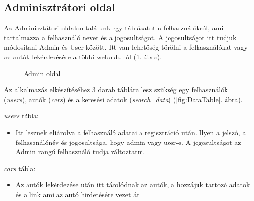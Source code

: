 \subsection{Adminisztrátori oldal}

Az Adminisztátori oldalon találunk egy táblázatot a felhasználókról, ami tartalmazza a felhasználó nevet és a jogosultságot. A jogosultságot itt tudjuk módosítani Admin és User között. Itt van lehetőség törölni a felhasználókat vagy az autók lekérdezésére a többi weboldalról (\ref{fig:Admin}. ábra).

\begin{figure}[h]
\centering
{}
\caption{Admin oldal}
\label{fig:Admin}
\end{figure}
\newpage


Az alkalmazás elkészítéséhez 3 darab táblára lesz szükség egy
felhasználók (\textit{users}), autók (\textit{cars}) és a keresési adatok (\textit{search\_data}) (\ref{fig:DataTable}. ábra).

\textit{users} tábla:
\begin{itemize}
\item Itt lesznek eltárolva a felhasználó adatai a regisztráció után. Ilyen a jelszó, a felhasználónév és jogosultsága, hogy admin vagy user-e. A jogosultságot az Admin rangú felhasználó tudja változtatni.
\end{itemize}

\textit{cars} tábla:
\begin{itemize}
\item Az autók lekérdezése után itt tárolódnak az autók,  a hozzájuk tartozó adatok és a link ami az autó hirdetésére vezet át
\end{itemize}

